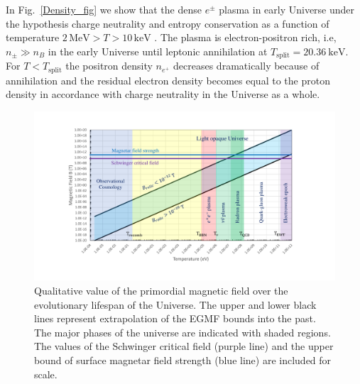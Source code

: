\documentclass[universe,article,submit,moreauthors,pdftex,a4paper]{Definitions/mdpi}
\newcommand*{\rf}[1]{Fig.~{\ref{#1}}}
\begin{document}
In \rf{Density_fig} we show that the dense $e^{\pm}$ plasma in early Universe under the hypothesis charge neutrality and entropy conservation as a function of temperature $2\,\mathrm{MeV}>T>10\,\mathrm{keV}$ \cite{Chris:2023abc}. The plasma is electron-positron rich, i.e, $n_{\pm}\gg n_B$ in the early Universe until leptonic annihilation at $T_{\mathrm{split}} = 20.36\ \mathrm{keV}$. For $T<T_{\mathrm{split}}$ the positron density $n_{e^+}$ decreases dramatically because of annihilation and the residual electron density becomes equal to the proton density in accordance with charge neutrality in the Universe as a whole.
\begin{figure}[htbp]
  \centering  \includegraphics[trim=110 50 120 40,clip,width=\textwidth]{./plots/relic_plot.PDF}
  \caption{Qualitative value of the primordial magnetic field over the evolutionary lifespan of the Universe. The upper and lower black lines represent extrapolation of the EGMF bounds into the past. The major phases of the universe are indicated with shaded regions. The values of the Schwinger critical field (purple line) and the upper bound of surface magnetar field strength (blue line) are included for scale.\label{relic_plot}}
\end{figure}
\end{document}
